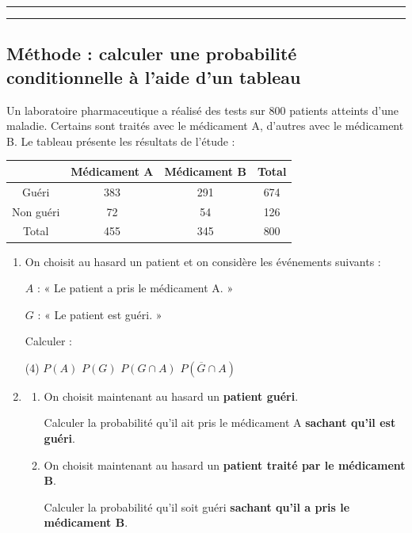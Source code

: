 \documentclass{article}
\theoremstyle{definition}
\begin{document}
\vfill

\hrule

\vfill
\setcounter{exercice}{0}
{
  \normalsize
  \textbf{\Niveau} \hfill \textbf{\Chapitre} \hfill \textbf{\Document}
}
\hrule

\subsection*{Méthode : calculer une probabilité conditionnelle à l'aide d'un tableau}

\noindent

Un laboratoire pharmaceutique a réalisé des tests sur 800 patients atteints d'une maladie.
Certains sont traités avec le médicament A, d'autres avec le médicament B.
Le tableau présente les résultats de l'étude :

\begin{center}
\begin{tabular}{|c|c|c|c|}
\hline
 & Médicament A & Médicament B & Total \\
\hline
Guéri & 383 & 291 & 674 \\
\hline
Non guéri & 72 & 54 & 126 \\
\hline
Total & 455 & 345 & 800 \\
\hline
\end{tabular}
\end{center}

\begin{enumerate}
    \item On choisit au hasard un patient et on considère les événements suivants :

    $A$ : « Le patient a pris le médicament A. »

    $G$ : « Le patient est guéri. »

    Calculer :
    \begin{tasks}(4)
        \task $P(A)$
        \task $P(G)$
        \task $P(G \cap A)$
        \task $P(\overline{G} \cap A)$
    \end{tasks}

    \item
    \begin{enumerate}
        \item On choisit maintenant au hasard un \textbf{patient guéri}.
        
        Calculer la probabilité qu'il ait pris le médicament A \textbf{sachant qu'il est guéri}.

        \item On choisit maintenant au hasard un \textbf{patient traité par le médicament B}.
        
        Calculer la probabilité qu'il soit guéri \textbf{sachant qu'il a pris le médicament B}.
    \end{enumerate}
\end{enumerate}
\end{document}
